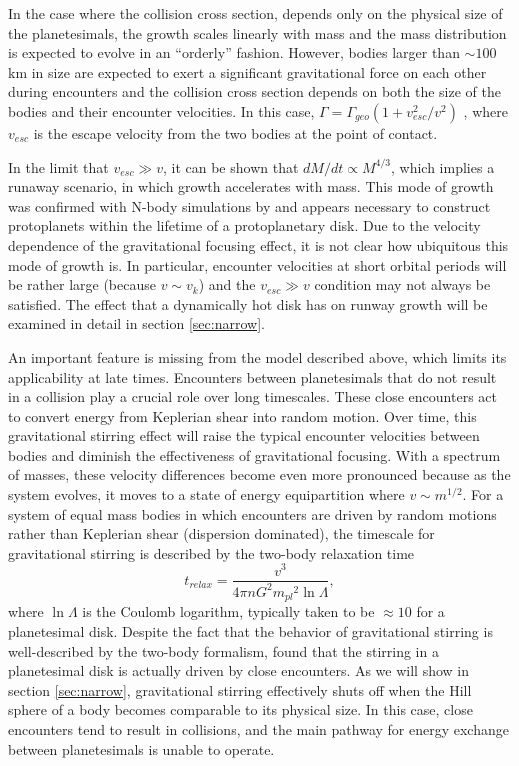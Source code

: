 \documentclass[twocolumn]{aastex63}
\begin{document}
In the case where the collision cross section, depends only
on the physical size of the planetesimals, the growth scales linearly
with mass and the mass distribution is expected to evolve in an
``orderly'' fashion. However, bodies larger than $\sim 100$ km in size are expected to exert a significant gravitational force on each other during encounters and the collision cross section depends on both the size of the bodies and their encounter velocities. In this case, $\Gamma = \Gamma_{geo} \left( 1 + v_{esc}^2 / v^2 \right)$ \citep{safronov69}, where $v_{esc}$ is the escape velocity from the two bodies at the point of contact.

In the limit that $v_{esc} \gg v$, it can be shown that $dM/dt \propto
M^{4/3}$, which implies a runaway scenario, in which growth
accelerates with mass. This mode of growth was confirmed with N-body
simulations by \citet{kokubo96} and appears necessary to construct
protoplanets within the lifetime of a protoplanetary disk. Due to the
velocity dependence of the gravitational focusing effect, it is not clear how ubiquitous this mode of growth is. In particular, encounter velocities at short orbital periods will be rather large (because $v \sim v_{k}$) and the $v_{esc} \gg v$ condition may not always be satisfied. The effect that a dynamically hot disk has on runway growth will be examined in detail in section \ref{sec:narrow}.

An important feature is missing from the model described above, which
limits its applicability at late times. Encounters between
planetesimals that do not result in a collision play a crucial role
over long timescales. These close encounters act to convert energy
from Keplerian shear into random motion. Over time, this gravitational
stirring effect will raise the typical encounter velocities between
bodies and diminish the effectiveness of gravitational focusing. With
a spectrum of masses, these velocity differences become even more
pronounced because as the system evolves, it moves to a state of
energy equipartition where $v \sim m^{1/2}$. For a system of equal mass bodies in which encounters are driven by random motions rather than Keplerian shear (dispersion dominated), the timescale for gravitational stirring is described by the two-body relaxation time \citep{ida93}
\begin{equation}\label{eq:relax}
	t_{relax} = \frac{v^3}{4 \pi n G^2 {m_{pl}}^2 \ln \Lambda},
\end{equation}
where $\ln \Lambda$ is the Coulomb logarithm,
typically taken to be $\approx 10$ for a planetesimal disk. Despite
the fact that the behavior of gravitational stirring is well-described
by the two-body formalism, \citep{ida93} found that the stirring in a planetesimal disk is actually driven by close encounters. As we will show in section \ref{sec:narrow}, gravitational stirring effectively shuts off when the Hill sphere of a body becomes comparable to its physical size. In this case, close encounters tend to result in collisions, and the main pathway for energy exchange between planetesimals is unable to operate.
\end{document}
